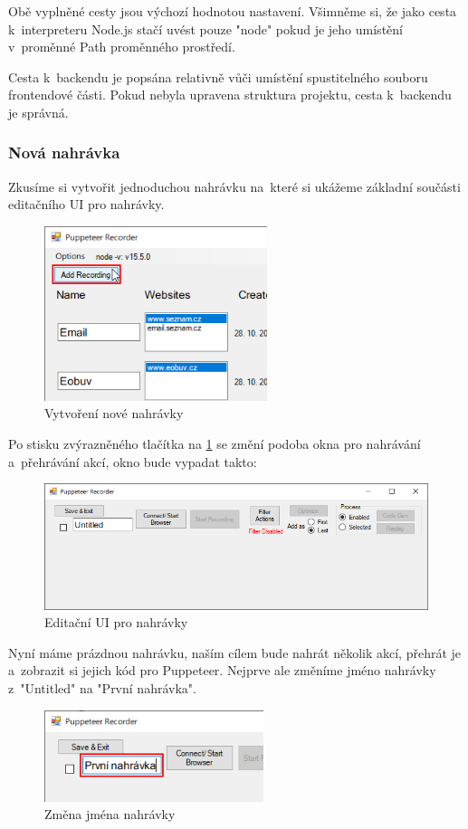 \documentclass[12pt, a4paper, twoside]{article}
\begin{document}
	Obě vyplněné cesty jsou výchozí hodnotou nastavení. Všimněme si, že jako cesta k~interpreteru Node.js stačí uvést pouze "node" pokud je jeho umístění v~proměnné Path proměnného prostředí. 
	
	Cesta k~backendu je popsána relativně vůči umístění spustitelného souboru frontendové části. Pokud nebyla upravena struktura projektu, cesta k~backendu je správná.
	\subsubsection{Nová nahrávka}
	Zkusíme si vytvořit jednoduchou nahrávku na~které si ukážeme základní součásti editačního UI pro nahrávky. 
	\begin{figure}[H]
		\centering
		\includegraphics[width=0.58\textwidth]{addNewRecording.png}
		\caption{Vytvoření nové nahrávky}
		\label{fig:addNewRecording}
	\end{figure}
	\newpage
	Po stisku zvýrazněného tlačítka na \cref{fig:addNewRecording} se změní podoba okna pro nahrávání a~přehrávání akcí, okno bude vypadat takto:
	\begin{figure}[H]
		\centering
		\includegraphics[width=1.0\textwidth]{emptyRecordingEdit.png}
		\caption{Editační UI pro nahrávky}
	\end{figure}
	Nyní máme prázdnou nahrávku, naším cílem bude nahrát několik akcí, přehrát je a~zobrazit si jejich kód pro Puppeteer. Nejprve ale změníme jméno nahrávky z~"Untitled" na "První nahrávka".
	\begin{figure}[H]
		\centering
		\includegraphics[width=0.57\textwidth]{recordingNameChange.png}
		\caption{Změna jména nahrávky}
	\end{figure}
\end{document}

